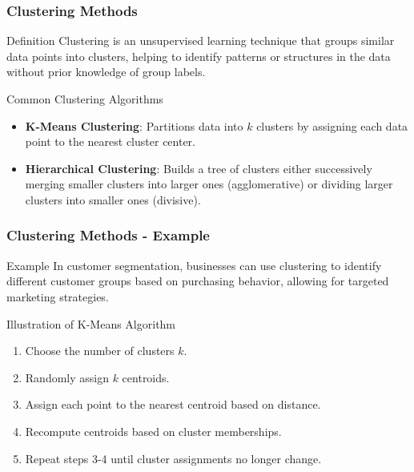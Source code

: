 \documentclass[aspectratio=169]{beamer}
\begin{document}
\begin{frame}[fragile]
    \frametitle{Clustering Methods}
    \begin{block}{Definition}
        Clustering is an unsupervised learning technique that groups similar data points into clusters, helping to identify patterns or structures in the data without prior knowledge of group labels.
    \end{block}

    \begin{block}{Common Clustering Algorithms}
        \begin{itemize}
            \item \textbf{K-Means Clustering}: Partitions data into $k$ clusters by assigning each data point to the nearest cluster center.
            \item \textbf{Hierarchical Clustering}: Builds a tree of clusters either successively merging smaller clusters into larger ones (agglomerative) or dividing larger clusters into smaller ones (divisive).
        \end{itemize}
    \end{block}
\end{frame}

\begin{frame}[fragile]
    \frametitle{Clustering Methods - Example}
    \begin{block}{Example}
        In customer segmentation, businesses can use clustering to identify different customer groups based on purchasing behavior, allowing for targeted marketing strategies.
    \end{block}
    
    \begin{block}{Illustration of K-Means Algorithm}
        \begin{enumerate}
            \item Choose the number of clusters $k$.
            \item Randomly assign $k$ centroids.
            \item Assign each point to the nearest centroid based on distance.
            \item Recompute centroids based on cluster memberships.
            \item Repeat steps 3-4 until cluster assignments no longer change.
        \end{enumerate}
    \end{block}
\end{frame}
\end{document}
